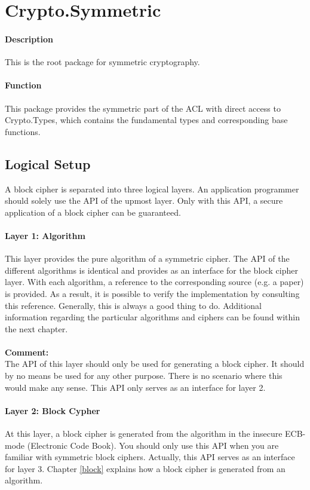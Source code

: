  \chapter{Crypto.Symmetric}

\subsubsection{Description}
This is the root package for symmetric cryptography.\\

\subsubsection{Function}
This package provides the symmetric part of the ACL with direct access to
Crypto.Types, which contains the fundamental types and corresponding base
functions.
 
\section{Logical Setup}
A block cipher is separated into three logical layers. An application programmer
should solely use the API of the upmost layer. Only with this API, a secure
application of a block cipher can be guaranteed.

\subsubsection{Layer 1: Algorithm}
This layer provides the pure algorithm of a symmetric cipher. The API of
the different algorithms is identical and provides as an interface for the
block cipher layer.
With each algorithm, a reference to the corresponding source (e.g. a paper)
is provided. As a result, it is possible to verify the implementation
by consulting this reference. Generally, this is always a good thing to do.
Additional information regarding the particular algorithms and ciphers can be
found within the next chapter. \\ \ \\
\textbf{Comment:}\\
The API of this layer should only be used for generating a block cipher.
It should by no means be used for any other purpose. There is no scenario
where this would make any sense. This API only serves as an interface for
layer 2.

\subsubsection{Layer 2: Block Cypher}
At this layer, a block cipher is generated from the algorithm in the
insecure ECB-mode (Electronic Code Book). You should only use this API when
you are familiar with symmetric block ciphers. Actually, this API serves as
an interface for layer 3.
Chapter \ref{block} explains how a block cipher is
generated from an algorithm.

